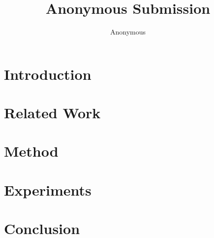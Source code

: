 \documentclass[10pt]{article}
\title{Anonymous Submission}
\author{Anonymous}
\date{}
\begin{document}
\maketitle

\begin{abstract}
\end{abstract}

\section{Introduction}

\section{Related Work}

\section{Method}

\section{Experiments}

\section{Conclusion}



\end{document}

